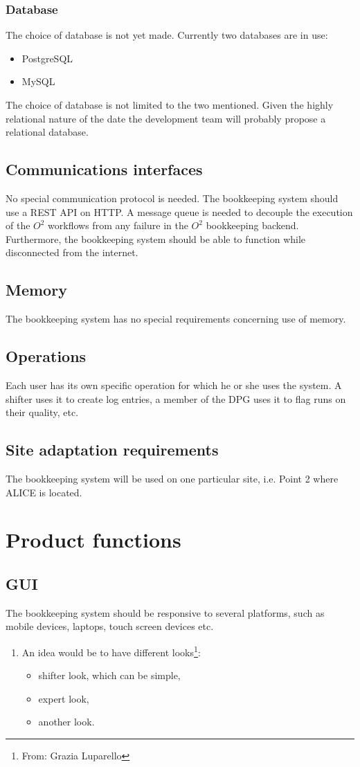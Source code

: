 \subsubsection{Database}
The choice of database is not yet made. Currently two databases are in use:
\begin{itemize}
  \item PostgreSQL
  \item MySQL
\end{itemize}
The choice of database is not limited to the two mentioned. Given the highly relational nature of the date the development team will probably propose a relational database.

\subsection{Communications interfaces}
No special communication protocol is needed. The bookkeeping system should use a REST API on HTTP. A message queue is needed to decouple the execution of the $O^2$ workflows from any failure in the $O^2$ bookkeeping backend. Furthermore, the bookkeeping system should be able to function while disconnected from the internet.

\subsection{Memory}
The bookkeeping system has no special requirements concerning use of memory.

\subsection{Operations}
Each user has its own specific operation for which he or she uses the system. A shifter uses it to create log entries, a member of the DPG uses it to flag runs on their quality, etc.

\subsection{Site adaptation requirements}
The bookkeeping system will be used on one particular site, i.e. Point 2 where ALICE is located.

\section{Product functions}
\subsection{GUI}
The bookkeeping system should be responsive to several platforms, such as mobile devices, laptops, touch screen devices etc.
\begin{enumerate}
  \item An idea would be to have different looks\footnote{From: Grazia Luparello}:
  \begin{itemize}
    \item shifter look, which can be simple,
    \item expert look,
    \item another look.
  \end{itemize}
\end{enumerate}
